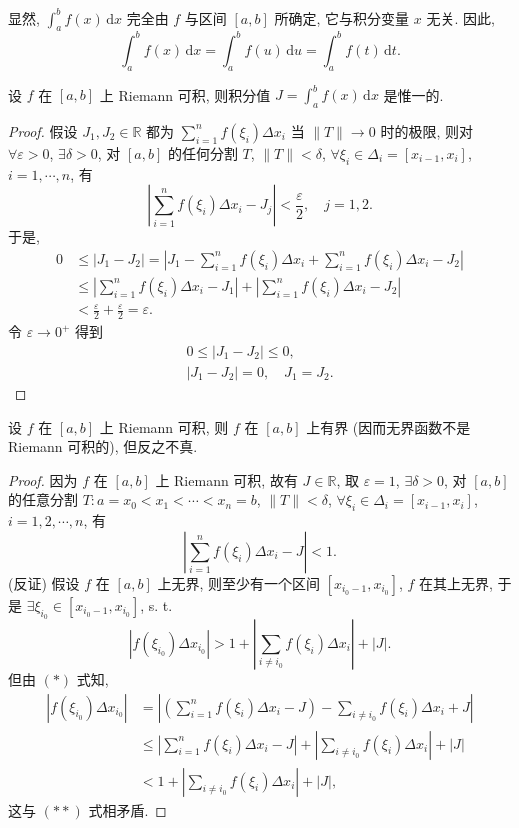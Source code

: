 显然, $\int_{a}^{b}f(x)\,\mathrm{d}x$ 完全由 $f$ 与区间 $[a,b]$ 所确定, 它与积分变量 $x$ 无关. 因此,
\[
\int_{a}^{b}f(x)\,\mathrm{d}x=\int_{a}^{b}f(u)\,\mathrm{d}u=\int_{a}^{b}f(t)\,\mathrm{d}t.
\]

\begin{theorem}[惟一性]\label{thm:6.1.1}
设 $f$ 在 $[a,b]$ 上 Riemann 可积, 则积分值 $J=\int_{a}^{b}f(x)\,\mathrm{d}x$ 是惟一的.
\end{theorem}

\begin{proof}
假设 $J_{1},J_{2}\in\mathbb{R}$ 都为 $\sum\limits_{i=1}^{n}f(\xi_{i})\Delta x_{i}$ 当 $\|T\|\to 0$ 时的极限, 则对 $\forall\varepsilon>0$, $\exists\delta>0$, 对 $[a,b]$ 的任何分割 $T$, $\|T\|<\delta$, $\forall\xi_{i}\in\Delta_{i}=[x_{i-1},x_{i}]$, $i=1,\cdots,n$, 有
\[
\left|\sum_{i=1}^{n}f(\xi_{i})\Delta x_{i}-J_{j}\right|<\frac{\varepsilon}{2},\quad j=1,2.
\]
于是,
\begin{align*}
0&\leqslant|J_{1}-J_{2}|=\left|J_{1}-\sum_{i=1}^{n}f(\xi_{i})\Delta x_{i}+\sum_{i=1}^{n}f(\xi_{i})\Delta x_{i}-J_{2}\right|\\
&\leqslant\left|\sum_{i=1}^{n}f(\xi_{i})\Delta x_{i}-J_{1}\right|+\left|\sum_{i=1}^{n}f(\xi_{i})\Delta x_{i}-J_{2}\right|\\
&<\frac{\varepsilon}{2}+\frac{\varepsilon}{2}=\varepsilon.
\end{align*}
令 $\varepsilon\to 0^{+}$ 得到
\begin{gather*}
0\leqslant|J_{1}-J_{2}|\leqslant 0,\\
|J_{1}-J_{2}|=0,\quad J_{1}=J_{2}.
\end{gather*}
\end{proof}

\begin{theorem}[可积的必要条件]\label{thm:6.1.2}
设 $f$ 在 $[a,b]$ 上 Riemann 可积, 则 $f$ 在 $[a,b]$ 上有界 (因而无界函数不是 Riemann 可积的), 但反之不真.
\end{theorem}

\begin{proof}
因为 $f$ 在 $[a,b]$ 上 Riemann 可积, 故有 $J\in\mathbb{R}$, 取 $\varepsilon=1$, $\exists\delta>0$, 对 $[a,b]$ 的任意分割 $T:a=x_{0}<x_{1}<\cdots<x_{n}=b$, $\|T\|<\delta$, $\forall\xi_{i}\in\Delta_{i}=[x_{i-1},x_{i}]$, $i=1,2,\cdots,n$, 有
\[
\left|\sum_{i=1}^{n}f(\xi_{i})\Delta x_{i}-J\right|<1. \tag*{(*)}
\]
(反证) 假设 $f$ 在 $[a,b]$ 上无界, 则至少有一个区间 $[x_{i_{0}-1},x_{i_{0}}]$, $f$ 在其上无界, 于是 $\exists\xi_{i_{0}}\in[x_{i_{0}-1},x_{i_{0}}]$, s. t.
\[
\left|f(\xi_{i_{0}})\Delta x_{i_{0}}\right|>1+\left|\sum_{i\neq i_{0}}f(\xi_{i})\Delta x_{i}\right|+|J|. \tag*{(**)}
\]
但由 $(*)$ 式知,
\begin{align*}
\left|f(\xi_{i_{0}})\Delta x_{i_{0}}\right|&=\left|\left(\sum_{i=1}^{n}f(\xi_{i})\Delta x_{i}-J\right)-\sum_{i\neq i_{0}}f(\xi_{i})\Delta x_{i}+J\right|\\
&\leqslant\left|\sum_{i=1}^{n}f(\xi_{i})\Delta x_{i}-J\right|+\left|\sum_{i\neq i_{0}}f(\xi_{i})\Delta x_{i}\right|+|J|\\
&<1+\left|\sum_{i\neq i_{0}}f(\xi_{i})\Delta x_{i}\right|+|J|,
\end{align*}
这与 $(**)$ 式相矛盾.
\end{proof}

